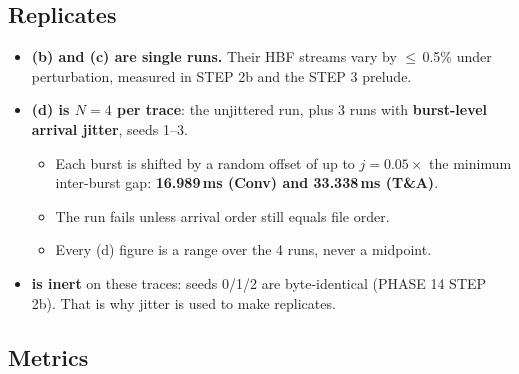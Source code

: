\documentclass[11pt,a4paper]{article}
\begin{document}
\subsection{Replicates}

\begin{itemize}
  \item \textbf{(b) and (c) are single runs.} Their HBF streams vary by
    $\le$\,0.5\% under perturbation, measured in STEP 2b and the STEP 3
    prelude.
  \item \textbf{(d) is $N = 4$ per trace}: the unjittered run, plus 3 runs
    with \textbf{burst-level arrival jitter}, seeds 1--3.
  \begin{itemize}
    \item Each burst is shifted by a random offset of up to
      $j = 0.05 \times$ the minimum inter-burst gap: \textbf{16.989\,ms
      (Conv) and 33.338\,ms (T\&A)}.
    \item The run fails unless arrival order still equals file order.
    \item Every (d) figure is a range over the 4 runs, never a midpoint.
  \end{itemize}
  \item \textbf{ is inert} on these traces: seeds 0/1/2
    are byte-identical (PHASE 14 STEP 2b). That is why jitter is used to make
    replicates.
\end{itemize}

\subsection{Metrics}
\end{document}
